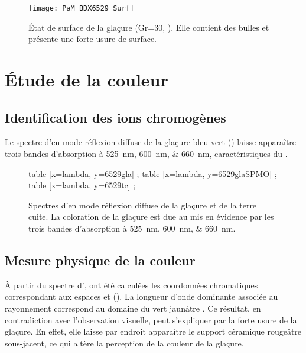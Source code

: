 \begin{figure}[htb]
  \texttt{[image: PaM\_BDX6529\_Surf]}
  \caption{\legendeB 
           État de surface de la glaçure (Gr=\num{30}, 
           ). Elle contient des 
           bulles et présente une forte usure de surface.}
  \label{surf:6529}
\end{figure}


\section{Étude de la couleur}

\subsection{Identification des ions chromogènes}
Le spectre d'\AO en mode réflexion diffuse de la glaçure bleu vert () laisse apparaître trois bandes d'absorption à \SIlist{525;600;660}{\nm}, caractéristiques du  \autocite{Lajarte_1979}.

\begin{figure}[htb]
  \begin{plotspectre}
       table [x=lambda, y=6529gla] {\gladata} ;
       table [x=lambda, y=6529glaSPMO] {\gladata} ;
       table [x=lambda, y=6529tc] {\tcdata} ;
  \end{plotspectre}
  \caption{\legendeB 
           Spectres d'\AO en mode réflexion diffuse de la glaçure et de la terre cuite. La coloration de la glaçure est due au  mis en évidence par les trois bandes d'absorption à \SIlist{525;600;660}{\nm}.}
  \label{spectre:6529}
\end{figure}

\subsection{Mesure physique de la couleur}
À partir du spectre d'\AO, ont été calculées les coordonnées chromatiques correspondant aux espaces \Yxy et \Lab (). La longueur d'onde dominante associée au rayonnement correspond au domaine du vert jaunâtre \autocite{Kelly_1976}. Ce résultat, en contradiction avec l'observation visuelle, peut s'expliquer par la forte usure de la glaçure. En effet, elle laisse par endroit apparaître le support céramique rougeâtre sous-jacent, ce qui altère la perception de la couleur de la glaçure.

